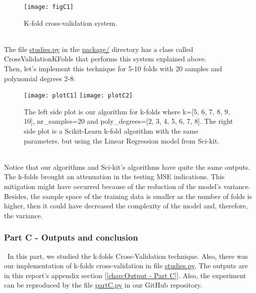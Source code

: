 \begin{figure}[H]
\label{fig:figC1}
\centering
\texttt{[image: figC1]}
\caption{K-fold cross-validation system.}
\end{figure}\\

The file \href{https://github.com/fabiorodp/UiO-FYS-STK4155/blob/master/Project1/package/studies.py}{studies.py} in the \href{https://github.com/fabiorodp/UiO-FYS-STK4155/tree/master/Project1/package}{package/} directory has a class called CrossValidationKFolds that performs this system explained above. \\

Then, let's implement this technique for 5-10 folds with 20 samples and polynomial degrees 2-8: \\

\begin{figure}[H]
\label{fig:plotC1-2}
\centering
\texttt{[image: plotC1]}
\texttt{[image: plotC2]}
\caption{The left side plot is our algorithm for k-folds where k=[5, 6, 7, 8, 9, 10], nr\_samples=20 and poly\_degrees=[2, 3, 4, 5, 6, 7, 8]. The right side plot is a Scikit-Learn k-fold algorithm with the same parameters, but using the Linear Regression model from Sci-kit.}
\end{figure}\\

Notice that our algorithms and Sci-kit's algorithms have quite the same outputs. \\

The k-folds brought an attenuation in the testing MSE indications. This mitigation might have occurred because of the reduction of the model's variance. Besides, the sample space of the training data is smaller as the number of folds is higher, then it could have decreased the complexity of the model and, therefore, the variance. \\

\subsubsection{Part C - Outputs and conclusion}
\label{chap:Part C - Outputs and conclusion}

\quad \, In this part, we studied the k-folds Cross-Validation technique. Also, there was our implementation of k-folds cross-validation in file \href{https://github.com/fabiorodp/UiO-FYS-STK4155/blob/master/Project1/package/studies.py}{studies.py}. The outputs are in this report's appendix section [\ref{chap:Output - Part C}]. Also, the experiment can be reproduced by the file \href{https://github.com/fabiorodp/UiO-FYS-STK4155/blob/master/Project1/partC.py}{partC.py} in our GitHub repository.\\

